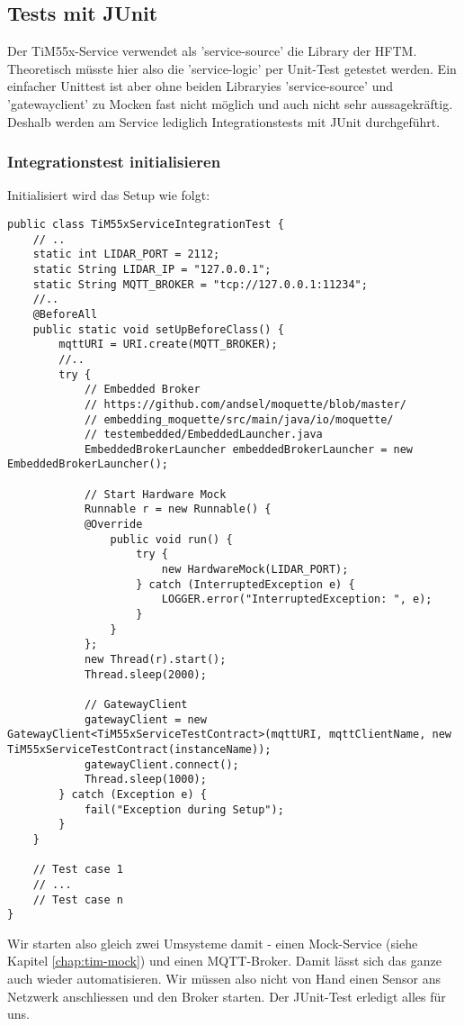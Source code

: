 \subsection{Tests mit JUnit}
Der TiM55x-Service verwendet als '\Gls{service-source}' die Library der HFTM. Theoretisch müsste hier also die '\Gls{service-logic}' per Unit-Test getestet werden. Ein einfacher Unittest ist aber ohne beiden Libraryies '\Gls{service-source}' und '\Gls{gatewayclient}' zu Mocken fast nicht möglich und auch nicht sehr aussagekräftig. Deshalb werden am Service lediglich Integrationstests mit JUnit durchgeführt.
\subsubsection{Integrationstest initialisieren}
Initialisiert wird das Setup wie folgt:
\begin{lstlisting}[caption={Integrations-Test Setup für TiM55x},label={lst:integrationstest-tim55x-setup}]
public class TiM55xServiceIntegrationTest {
    // ..
    static int LIDAR_PORT = 2112;
    static String LIDAR_IP = "127.0.0.1";
    static String MQTT_BROKER = "tcp://127.0.0.1:11234";
    //.. 
    @BeforeAll
    public static void setUpBeforeClass() {
        mqttURI = URI.create(MQTT_BROKER);
        //..
        try {
            // Embedded Broker
            // https://github.com/andsel/moquette/blob/master/
            // embedding_moquette/src/main/java/io/moquette/
            // testembedded/EmbeddedLauncher.java
            EmbeddedBrokerLauncher embeddedBrokerLauncher = new EmbeddedBrokerLauncher();

            // Start Hardware Mock
            Runnable r = new Runnable() {
            @Override
                public void run() {
                    try {
                        new HardwareMock(LIDAR_PORT);
                    } catch (InterruptedException e) {
                        LOGGER.error("InterruptedException: ", e);
                    }
                }
            };
            new Thread(r).start();
            Thread.sleep(2000);

            // GatewayClient
            gatewayClient = new GatewayClient<TiM55xServiceTestContract>(mqttURI, mqttClientName, new TiM55xServiceTestContract(instanceName));
            gatewayClient.connect();
            Thread.sleep(1000);
        } catch (Exception e) {
            fail("Exception during Setup");
        } 
    }
    
    // Test case 1
    // ...
    // Test case n
}
\end{lstlisting}
Wir starten also gleich zwei Umsysteme damit - einen Mock-Service (siehe Kapitel \ref{chap:tim-mock}) und einen MQTT-Broker. Damit lässt sich das ganze auch wieder automatisieren. Wir müssen also nicht von Hand einen Sensor ans Netzwerk anschliessen und den Broker starten. Der JUnit-Test erledigt alles für uns.
